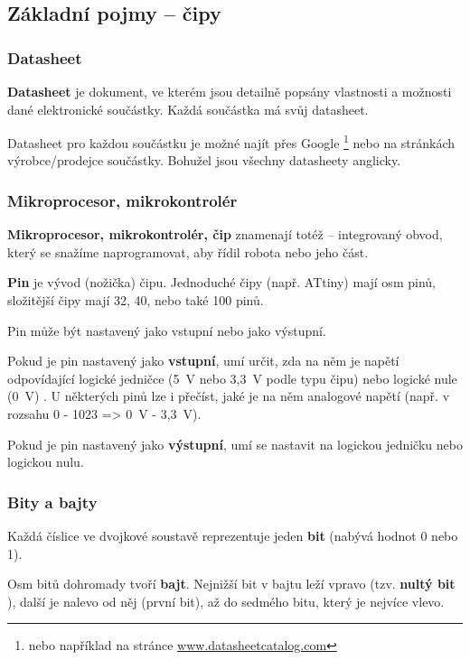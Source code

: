 \subsection{Základní pojmy -- čipy}

\subsubsection{Datasheet}

{\bf Datasheet}  je dokument, ve kterém jsou detailně popsány vlastnosti a možnosti dané elektronické součástky.
 Každá součástka má svůj datasheet. 

Datasheet pro každou součástku je možné najít přes Google \footnote{nebo například na stránce \url{www.datasheetcatalog.com}}
 nebo na stránkách výrobce/prodejce součástky. 
 Bohužel jsou všechny datasheety anglicky.  

\subsubsection{Mikroprocesor, mikrokontrolér} 

{\bf Mikroprocesor, mikrokontrolér, čip}   
 znamenají totéž -- integrovaný obvod, který se snažíme naprogramovat, aby řídil robota nebo jeho část. \hypertarget{cip1}{}

{\bf Pin}  je vývod (nožička) čipu. Jednoduché čipy (např. ATtiny) mají osm pinů, složitější čipy mají 32, 40, nebo také 100 pinů.

Pin může být nastavený jako vstupní nebo jako výstupní. 

Pokud je pin nastavený jako {\bf vstupní}, umí určit, zda na něm je napětí odpovídající logické jedničce (5~V nebo 3,3~V podle typu čipu) nebo logické nule (0~V) . 
U některých pinů lze i přečíst, jaké je na něm analogové napětí (např. v rozsahu 0 - 1023 => 0~V - 3,3~V). 

Pokud je pin nastavený jako {\bf výstupní},  umí se nastavit na logickou jedničku nebo logickou nulu. 

\subsubsection{Bity a bajty}

Každá číslice ve dvojkové soustavě reprezentuje jeden {\bf bit}  (nabývá hodnot 0 nebo 1). 

Osm bitů dohromady tvoří  {\bf bajt}. 
Nejnižší bit v bajtu leží vpravo (tzv. {\bf nultý bit}   ),  
další je nalevo od něj (první bit), až do sedmého bitu, který je nejvíce vlevo.




